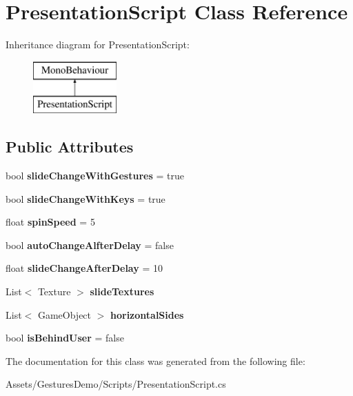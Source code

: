 \hypertarget{class_presentation_script}{}\section{Presentation\+Script Class Reference}
\label{class_presentation_script}
Inheritance diagram for Presentation\+Script\+:\begin{figure}[H]
\begin{center}
\leavevmode
\includegraphics[height=2.000000cm]{class_presentation_script}
\end{center}
\end{figure}
\subsection*{Public Attributes}
\begin{DoxyCompactItemize}
\item 
\mbox{\label{class_presentation_script_af4aad264ed181c135c3586eff805345b}} 
bool {\bfseries slide\+Change\+With\+Gestures} = true
\item 
\mbox{\label{class_presentation_script_a30687753f5035843cdfa920a81ae15e9}} 
bool {\bfseries slide\+Change\+With\+Keys} = true
\item 
\mbox{\label{class_presentation_script_af81c0a8a911a305f8a3aa269ce558181}} 
float {\bfseries spin\+Speed} = 5
\item 
\mbox{\label{class_presentation_script_ad88b126aebf1a294e12e897847d9e975}} 
bool {\bfseries auto\+Change\+Alfter\+Delay} = false
\item 
\mbox{\label{class_presentation_script_a4aff472bbfc23c274b6da3d0172a8bb1}} 
float {\bfseries slide\+Change\+After\+Delay} = 10
\item 
\mbox{\label{class_presentation_script_aedc1874d27439b88057822e0c8c3a00e}} 
List$<$ Texture $>$ {\bfseries slide\+Textures}
\item 
\mbox{\label{class_presentation_script_a2a2dd7e343b98335497e52061a41cd52}} 
List$<$ Game\+Object $>$ {\bfseries horizontal\+Sides}
\item 
\mbox{\label{class_presentation_script_ac6da9810878992688f780d61c7bb613c}} 
bool {\bfseries is\+Behind\+User} = false
\end{DoxyCompactItemize}


The documentation for this class was generated from the following file\+:\begin{DoxyCompactItemize}
\item 
Assets/\+Gestures\+Demo/\+Scripts/Presentation\+Script.\+cs\end{DoxyCompactItemize}
